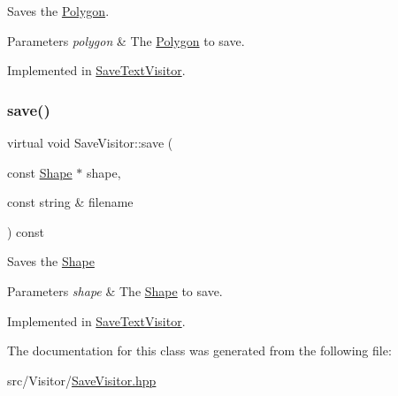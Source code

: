 Saves the \hyperlink{class_polygon}{Polygon}. 
\begin{DoxyParams}{Parameters}
{\em polygon} & The \hyperlink{class_polygon}{Polygon} to save. \\
\hline
\end{DoxyParams}


Implemented in \hyperlink{class_save_text_visitor_a9b4292ce11779caf26556cf6abc5db0f}{Save\+Text\+Visitor}.

\hypertarget{class_save_visitor_a0d6549287b18302461912fe454a08af2}{}\label{class_save_visitor_a0d6549287b18302461912fe454a08af2} 
\subsubsection{\texorpdfstring{save()}{save()}\hspace{0.1cm}{\footnotesize\ttfamily [5/5]}}
{\footnotesize\ttfamily virtual void Save\+Visitor\+::save (\begin{DoxyParamCaption}\item[{const \hyperlink{class_shape}{Shape} $\ast$}]{shape,  }\item[{const string \&}]{filename }\end{DoxyParamCaption}) const\hspace{0.3cm}{\ttfamily [pure virtual]}}

Saves the \hyperlink{class_shape}{Shape} 
\begin{DoxyParams}{Parameters}
{\em shape} & The \hyperlink{class_shape}{Shape} to save. \\
\hline
\end{DoxyParams}


Implemented in \hyperlink{class_save_text_visitor_aa73d6b9e27e6b95d058c089fb4900514}{Save\+Text\+Visitor}.



The documentation for this class was generated from the following file\+:\begin{DoxyCompactItemize}
\item 
src/\+Visitor/\hyperlink{_save_visitor_8hpp}{Save\+Visitor.\+hpp}\end{DoxyCompactItemize}
